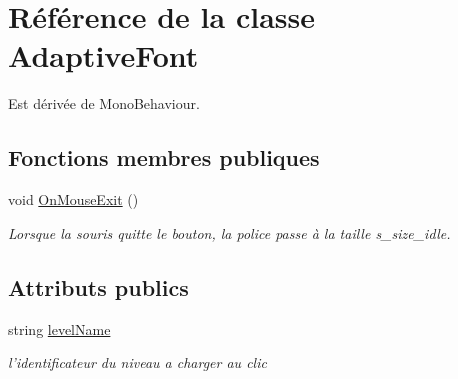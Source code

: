 \hypertarget{class_adaptive_font}{\section{Référence de la classe Adaptive\+Font}
\label{class_adaptive_font}
}


Est dérivée de Mono\+Behaviour.

\subsection*{Fonctions membres publiques}
\begin{DoxyCompactItemize}
\item 
\hypertarget{class_adaptive_font_a84fcf4d49a4254c0ba4d27bbd8f24a6b}{void \hyperlink{class_adaptive_font_a84fcf4d49a4254c0ba4d27bbd8f24a6b}{On\+Mouse\+Exit} ()}\label{class_adaptive_font_a84fcf4d49a4254c0ba4d27bbd8f24a6b}

\begin{DoxyCompactList}\small\item\em Lorsque la souris quitte le bouton, la police passe à la taille s\+\_\+size\+\_\+idle. \end{DoxyCompactList}\end{DoxyCompactItemize}
\subsection*{Attributs publics}
\begin{DoxyCompactItemize}
\item 
\hypertarget{class_adaptive_font_ad6983c8a4fbb77aa7ca336ced0da2d33}{string \hyperlink{class_adaptive_font_ad6983c8a4fbb77aa7ca336ced0da2d33}{level\+Name}}\label{class_adaptive_font_ad6983c8a4fbb77aa7ca336ced0da2d33}

\begin{DoxyCompactList}\small\item\em l'identificateur du niveau a charger au clic \end{DoxyCompactList}\end{DoxyCompactItemize}
